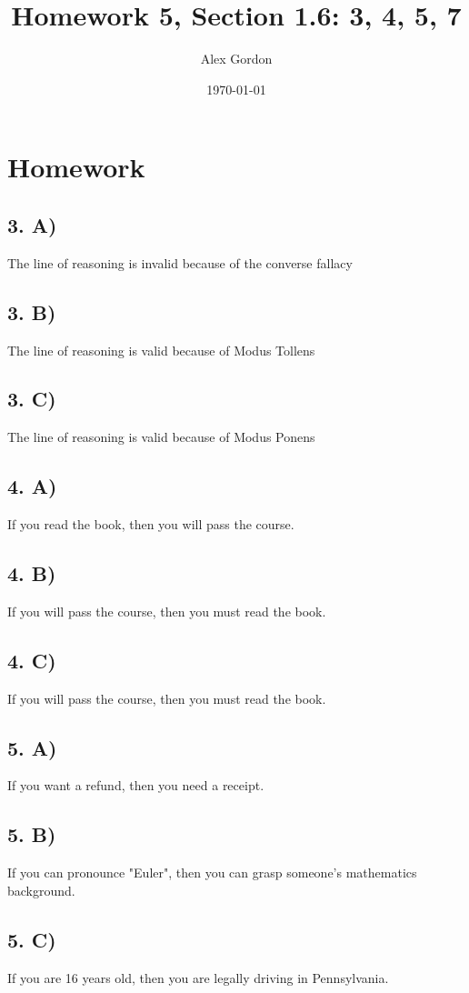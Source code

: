 \documentclass[12]{scrartcl}
\begin{document}
\title{Homework 5, Section 1.6: 3, 4, 5, 7}
\author{Alex Gordon}
\date{\today}
\maketitle
\section*{Homework}
\subsection*{3. A)}
The line of reasoning is invalid because of the converse fallacy
\subsection*{3. B)}
The line of reasoning is valid because of Modus Tollens
\subsection*{3. C)}
The line of reasoning is valid because of Modus Ponens
\subsection*{4. A)}
If you read the book, then you will pass the course.
\subsection*{4. B)}
If you will pass the course, then you must read the book. 
\subsection*{4. C)}
If you will pass the course, then you must read the book. 
\subsection*{5. A)}
If you want a refund, then you need a receipt. 
\subsection*{5. B)}
If you can pronounce "Euler", then you can grasp someone's mathematics background. 
\subsection*{5. C)}
If you are 16 years old, then you are legally driving in Pennsylvania. 
\end{document}
